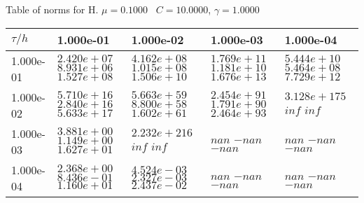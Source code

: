 \begin{center}
Table of norms for H. $\mu = 0.1000$ \, $C = 10.0000$, $\gamma = 1.0000$
  
\begin{tabular}{|p{1in}|p{1in}|p{1in}|p{1in}|p{1in}|} \hline
$\tau / h$ &1.000e-01 &1.000e-02 &1.000e-03 &1.000e-04 \\ \hline 
1.000e-01 & $2.420e+07$  $8.931e+06$  $1.527e+08$  & $4.162e+08$  $1.015e+08$  $1.506e+10$  & $1.769e+11$  $1.181e+10$  $1.676e+13$  & $5.444e+10$  $5.464e+08$  $7.729e+12$  \\ \hline 
1.000e-02 & $5.710e+16$  $2.840e+16$  $5.633e+17$  & $5.663e+59$  $8.800e+58$  $1.602e+61$  & $2.454e+91$  $1.791e+90$  $2.464e+93$  & $3.128e+175$  $inf$  $inf$  \\ \hline 
1.000e-03 & $3.881e+00$  $1.149e+00$  $1.627e+01$  & $2.232e+216$  $inf$  $inf$  & $nan$  $-nan$  $-nan$  & $nan$  $-nan$  $-nan$  \\ \hline 
1.000e-04 & $2.368e+00$  $8.436e-01$  $1.160e+01$  & $4.524e-03$  $2.327e-03$  $2.437e-02$  & $nan$  $-nan$  $-nan$  & $nan$  $-nan$  $-nan$  \\ \hline 

\end{tabular}\\[20pt]
\end{center}
